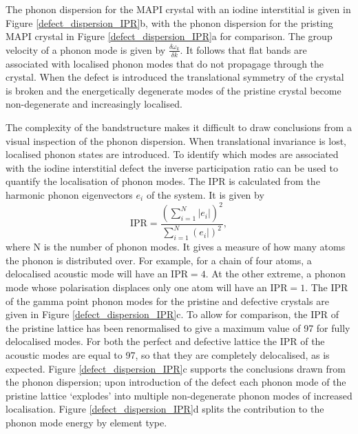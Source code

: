 The phonon dispersion for the MAPI crystal with an iodine interstitial is given in Figure \ref{defect_dispersion_IPR}b, with the phonon dispersion for the pristing MAPI crystal in Figure \ref{defect_dispersion_IPR}a for comparison.
The group velocity of a phonon mode is given by $\frac{\delta \omega_k}{\delta k}$. It follows that flat bands are associated with localised phonon modes that do not propagage through the crystal. 
When the defect is introduced the translational symmetry of the crystal is broken and the energetically degenerate modes of the pristine crystal become non-degenerate and increasingly localised.

The complexity of the bandstructure makes it difficult to draw conclusions from a visual inspection of the phonon dispersion.
When translational invariance is lost, localised phonon states are introduced.
To identify which modes are associated with the iodine interstitial defect the inverse participation ratio can be used to quantify the localisation of phonon modes. 
The IPR is calculated from the harmonic phonon eigenvectors $e_i$ of the system. It is given by
\begin{equation}
\mathrm{IPR} = \frac{\left(\sum_{i=1}^N|e_i|\right)^2}{\sum_{i=1}^N\left(e_i|\right)^2},
\end{equation}
where N is the number of phonon modes. It gives a measure of how many atoms the phonon is distributed over. For example, for a chain of four atoms, a delocalised acoustic mode will have an $\textrm{IPR}=4$. At the other extreme, a phonon mode whose polarisation displaces only one atom will have an $\textrm{IPR}=1$.
The IPR of the gamma point phonon modes for the pristine and defective crystals are given in Figure \ref{defect_dispersion_IPR}c.
To allow for comparison, the IPR of the pristine lattice has been renormalised to give a maximum value of 97 for fully delocalised modes.
For both the perfect and defective lattice the IPR of the acoustic modes are equal to 97, so that they are completely delocalised, as is expected.
Figure \ref{defect_dispersion_IPR}c supports the conclusions drawn from the phonon dispersion; upon introduction of the defect each phonon mode of the pristine lattice `explodes' into multiple non-degenerate phonon modes of increased localisation.
Figure \ref{defect_dispersion_IPR}d splits the contribution to the phonon mode energy by element type. 
